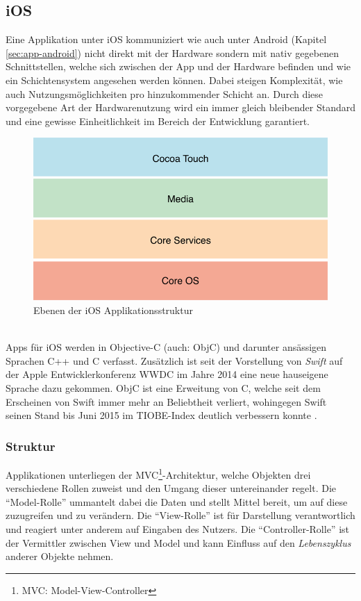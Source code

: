 \subsection{iOS}
	Eine Applikation unter iOS kommuniziert wie auch unter Android (Kapitel
	\ref{sec:app-android}) nicht direkt mit  der Hardware sondern mit nativ
	gegebenen Schnittstellen, welche sich zwischen der App und der Hardware
	befinden und wie ein Schichtensystem angesehen werden können. Dabei steigen
	Komplexität, wie auch Nutzungsmöglichkeiten pro hinzukommender Schicht an.
	Durch diese vorgegebene Art der Hardwarenutzung wird ein immer gleich
	bleibender Standard und eine gewisse Einheitlichkeit im Bereich der Entwicklung
	garantiert.
	\begin{figure}[h]
		\centering
		\includegraphics[width=0.5\linewidth]{ios/media/ios-layers.png}
		\caption{Ebenen der iOS Applikationsstruktur
		\cite{AboutiOSTech2015}}
		\label{fig:marcetshare}
	\end{figure}
	\\
	Apps für iOS werden in Objective-C (auch: ObjC) und darunter ansässigen
	Sprachen C++ und C verfasst. Zusätzlich ist seit der Vorstellung von
	\textsl{Swift} auf der Apple Entwicklerkonferenz WWDC im Jahre 2014 eine
	neue hauseigene Sprache dazu gekommen. ObjC ist eine Erweitung von C, welche
	seit dem Erscheinen von Swift immer mehr an Beliebtheit verliert, wohingegen
	Swift seinen Stand bis Juni 2015 im TIOBE-Index deutlich verbessern
	konnte \cite{TIOBE062015}.
	\subsubsection{Struktur}
		Applikationen unterliegen der MVC\footnote{MVC:
		Model-View-Controller}-Architektur, welche Objekten drei verschiedene Rollen
		zuweist und den Umgang dieser untereinander regelt. Die "`Model-Rolle"'
		ummantelt dabei die Daten und stellt Mittel bereit, um auf diese zuzugreifen
		und zu verändern. Die "`View-Rolle"' ist für Darstellung verantwortlich und
		reagiert unter anderem auf Eingaben des Nutzers. Die "`Controller-Rolle"' ist
		der Vermittler zwischen View und Model und kann Einfluss auf den
		\textsl{Lebenszyklus} anderer Objekte nehmen.
